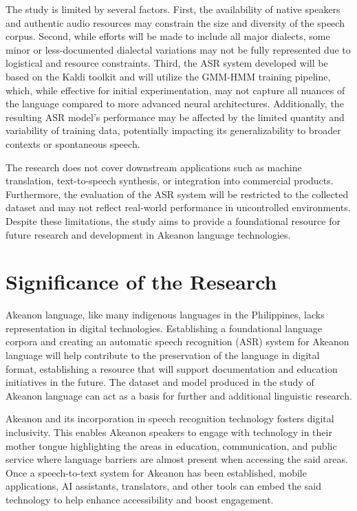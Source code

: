 The study is limited by several factors. First, the availability of native speakers and authentic audio resources may constrain the size and diversity of the speech corpus. Second, while efforts will be made to include all major dialects, some minor or less-documented dialectal variations may not be fully represented due to logistical and resource constraints. Third, the ASR system developed will be based on the Kaldi toolkit and will utilize the GMM-HMM training pipeline, which, while effective for initial experimentation, may not capture all nuances of the language compared to more advanced neural architectures. Additionally, the resulting ASR model’s performance may be affected by the limited quantity and variability of training data, potentially impacting its generalizability to broader contexts or spontaneous speech.

The research does not cover downstream applications such as machine translation, text-to-speech synthesis, or integration into commercial products. Furthermore, the evaluation of the ASR system will be restricted to the collected dataset and may not reflect real-world performance in uncontrolled environments. Despite these limitations, the study aims to provide a foundational resource for future research and development in Akeanon language technologies.


\section{Significance of the Research}
\label{sec:significance}

Akeanon language, like many indigenous languages in the Philippines, lacks representation in digital technologies. Establishing a foundational language corpora and creating an automatic speech recognition (ASR) system for Akeanon language will help contribute to the preservation of the language in digital format, establishing a resource that will support documentation and education initiatives in the future. The dataset and model produced in the study of Akeanon language can act as a basis for further and additional linguistic research.

Akeanon and its incorporation in speech recognition technology fosters digital inclusivity. This enables Akeanon speakers to engage with technology in their mother tongue highlighting the areas in education, communication, and public service where language barriers are almost present when accessing the said areas. Once a speech-to-text system for Akeanon has been established, mobile applications, AI assistants, translators, and other tools can embed the said technology to help enhance accessibility and boost engagement.


